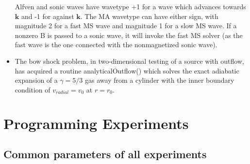 \documentclass[letterpaper,12pt]{article}
\begin{document}
\begin{itemize}
Alfven and sonic waves have wavetype +1 for a wave which advances towards $\mathbf{k}$ and -1 for
against $\mathbf{k}$. The MA wavetype can have either sign, with magnitude 2 for a fast MS
wave and magnitude 1 for a slow MS wave. If a nonzero B is passed to a sonic wave, it will invoke the
fast MS solver (as the fast wave is the one connected with the nonmagnetized sonic wave).
\item The bow shock problem, in two-dimensional testing of a source with outflow, has acquired a routine
analyticalOutflow() which solves the exact adiabatic expansion of a $\gamma=5/3$ gas away from a cylinder
with the inner boundary condition of $v_{radial} = v_0$ at $r=r_0$.
\end{itemize}

\section{Programming Experiments}

\subsection{Common parameters of all experiments}
\end{document}
